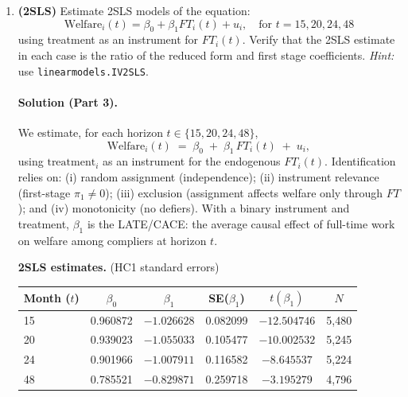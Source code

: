 \documentclass[12pt]{article}
\begin{document}
\begin{enumerate}[label=\arabic*.]
    \noindent\emph{Notes.} The last two columns equal the model-implied probabilities: \(\Pr[W{=}1\mid Z{=}0]=\delta_0\) and \(\Pr[W{=}1\mid Z{=}1]=\delta_0+\delta_1\).

    \medskip
    \noindent\textbf{Interpretation.} Assignment to SSP substantially \emph{reduced} welfare receipt at all horizons: \(\delta_1<0\) and statistically significant (1\% level or better). At \(t=15\), the control mean is about \(81\%\) while the treated mean is about \(67\%\), a decline of \(\approx 14\) percentage points (\(t\approx-12.1\)). The ITT effect attenuates over time to \(\approx-12\) p.p.\ at 20 months, \(\approx-11\) p.p.\ at 24 months, and \(\approx-4\) p.p.\ by 48 months (still significant, \(t\approx-2.94\)). This pattern is consistent with the program inducing earlier exits from welfare that partly dissipate once the subsidy period ends.  

    \item \textbf{(2SLS)} Estimate 2SLS models of the equation:
    \[
    \text{Welfare}_i(t) = \beta_0 + \beta_1 FT_i(t) + u_i, \quad \text{for } t = 15, 20, 24, 48
    \]
    using treatment as an instrument for $FT_i(t)$. Verify that the 2SLS estimate in each case is the ratio of the reduced form and first stage coefficients. \emph{Hint:} use \texttt{linearmodels.IV2SLS}.

    \paragraph{Solution (Part 3).}
    We estimate, for each horizon \(t\in\{15,20,24,48\}\),
    \[
    \text{Welfare}_i(t) \;=\; \beta_0 \;+\; \beta_1\, FT_i(t) \;+\; u_i,
    \]
    using \(\text{treatment}_i\) as an instrument for the endogenous \(FT_i(t)\).
    Identification relies on: (i) random assignment (independence); (ii) instrument
    relevance (first-stage \(\pi_1\neq 0\)); (iii) exclusion (assignment affects
    welfare only through \(FT\)); and (iv) monotonicity (no defiers). With a binary
    instrument and treatment, \(\beta_1\) is the LATE/CACE: the average causal effect
    of full-time work on welfare among compliers at horizon \(t\).

    \medskip
    \noindent\textbf{2SLS estimates.} (HC1 standard errors)

    \begin{center}
    \begin{tabular}{@{}lccccc@{}}
    \toprule
    Month ($t$) & $\beta_0$ & $\beta_1$ & SE($\beta_1$) & $t(\beta_1)$ & $N$ \\
    \midrule
    15 & 0.960872 & $-1.026628$ & 0.082099 & $-12.504746$ & 5{,}480 \\
    20 & 0.939023 & $-1.055033$ & 0.105477 & $-10.002532$ & 5{,}245 \\
    24 & 0.901966 & $-1.007911$ & 0.116582 & $-8.645537$  & 5{,}224 \\
    48 & 0.785521 & $-0.829871$ & 0.259718 & $-3.195279$  & 4{,}796 \\
    \bottomrule
    \end{tabular}
    \end{center}


\end{enumerate}
\end{document}

